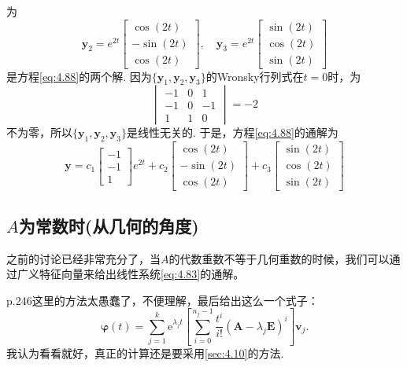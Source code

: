 \begin{solution}
\[    \]
    为
    \[
        \mathbf{y}_2=e^{2t}\begin{bmatrix}
            \cos(2t)  \\
            -\sin(2t) \\
            \cos(2t)
        \end{bmatrix},\quad \mathbf{y}_3=e^{2t}\begin{bmatrix}
            \sin(2t) \\
            \cos(2t) \\
            \sin(2t)
        \end{bmatrix}
    \]
    是方程\ref{eq:4.88}的两个解. 因为$\{\mathbf{y}_1,\mathbf{y}_2,\mathbf{y}_3\}$的Wronsky行列式在$t=0$时，为
    \[
        \begin{vmatrix}
            -1 & 0 & 1  \\
            -1 & 0 & -1 \\
            1  & 1 & 0
        \end{vmatrix}=-2
    \]
    不为零，所以$\{\mathbf{y}_1,\mathbf{y}_2,\mathbf{y}_3\}$是线性无关的. 于是，方程\ref{eq:4.88}的通解为
    \[
        \mathbf{y}=c_1\begin{bmatrix}
            -1 \\
            -1 \\
            1
        \end{bmatrix}e^{2t}+c_2\begin{bmatrix}
            \cos(2t)  \\
            -\sin(2t) \\
            \cos(2t)
        \end{bmatrix}+c_3\begin{bmatrix}
            \sin(2t) \\
            \cos(2t) \\
            \sin(2t)
        \end{bmatrix}
    \]
\end{solution}

\subsection{$A$为常数时(从几何的角度)}
之前的讨论已经非常充分了，当$A$的代数重数不等于几何重数的时候，我们可以通过广义特征向量来给出线性系统\ref{eq:4.83}的通解。

\cite{王高雄}p.246这里的方法太愚蠢了，不便理解，最后给出这么一个式子：
\[
    \boldsymbol{\varphi}(t)=\sum_{j=1}^k \mathrm{e}^{\lambda_j t}\left[\sum_{i=0}^{n_j-1} \frac{t^i}{i!}\left(\boldsymbol{A}-\lambda_j \boldsymbol{E}\right)^i\right] \boldsymbol{v}_j .
\]
我认为看看就好，真正的计算还是要采用\ref{sec:4.10}的方法.

